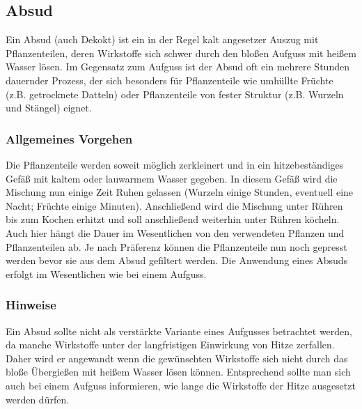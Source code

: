 \subsection{Absud}

Ein Absud (auch Dekokt) ist ein in der Regel kalt angesetzer Auszug mit Pflanzenteilen, deren Wirkstoffe sich schwer durch den bloßen Aufguss mit heißem Wasser lösen. Im Gegensatz zum Aufguss ist der Absud oft ein mehrere Stunden dauernder Prozess, der sich besonders für Pflanzenteile wie umhüllte Früchte (z.B. getrocknete Datteln) oder Pflanzenteile von fester Struktur (z.B. Wurzeln und Stängel) eignet.

\subsubsection{Allgemeines Vorgehen}

Die Pflanzenteile werden soweit möglich zerkleinert und in ein hitzebeständiges Gefäß mit kaltem oder lauwarmem Wasser gegeben. In diesem Gefäß wird die Mischung nun einige Zeit Ruhen gelassen (Wurzeln einige Stunden, eventuell eine Nacht; Früchte einige Minuten). Anschließend wird die Mischung unter Rühren bis zum Kochen erhitzt und soll anschließend weiterhin unter Rühren köcheln. Auch hier hängt die Dauer im Wesentlichen von den verwendeten Pflanzen und Pflanzenteilen ab. Je nach Präferenz können die Pflanzenteile nun noch gepresst werden bevor sie aus dem Absud gefiltert werden.
Die Anwendung eines Absuds erfolgt im Wesentlichen wie bei einem Aufguss.

\subsubsection{Hinweise}

Ein Absud sollte nicht als verstärkte Variante eines Aufgusses betrachtet werden, da manche Wirkstoffe unter der langfristigen Einwirkung von Hitze zerfallen. Daher wird er angewandt wenn die gewünschten Wirkstoffe sich nicht durch das bloße Übergießen mit heißem Wasser lösen können. Entsprechend sollte man sich auch bei einem Aufguss informieren, wie lange die Wirkstoffe der Hitze ausgesetzt werden dürfen.

						


						
						
																	